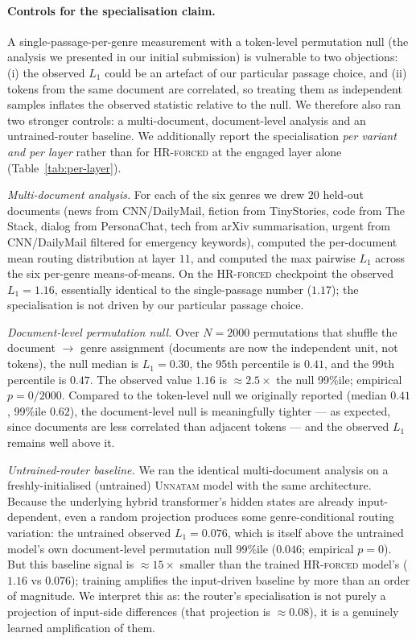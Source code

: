 \paragraph{Controls for the specialisation claim.} A single-passage-per-genre measurement with a token-level permutation null (the analysis we presented in our initial submission) is vulnerable to two objections: (i) the observed $L_1$ could be an artefact of our particular passage choice, and (ii) tokens from the same document are correlated, so treating them as independent samples inflates the observed statistic relative to the null. We therefore also ran two stronger controls: a multi-document, document-level analysis and an untrained-router baseline. We additionally report the specialisation \emph{per variant and per layer} rather than for \textsc{HR-forced} at the engaged layer alone (Table~\ref{tab:per-layer}).

\emph{Multi-document analysis.} For each of the six genres we drew $20$ held-out documents (news from CNN/DailyMail, fiction from TinyStories, code from The Stack, dialog from PersonaChat, tech from arXiv summarisation, urgent from CNN/DailyMail filtered for emergency keywords), computed the per-document mean routing distribution at layer $11$, and computed the max pairwise $L_1$ across the six per-genre means-of-means. On the \textsc{HR-forced} checkpoint the observed $L_1 = 1.16$, essentially identical to the single-passage number ($1.17$); the specialisation is not driven by our particular passage choice.

\emph{Document-level permutation null.} Over $N=2000$ permutations that shuffle the document $\to$ genre assignment (documents are now the independent unit, not tokens), the null median is $L_1 = 0.30$, the 95th percentile is $0.41$, and the 99th percentile is $0.47$. The observed value $1.16$ is $\approx 2.5\times$ the null 99\%ile; empirical $p = 0/2000$. Compared to the token-level null we originally reported (median $0.41$, 99\%ile $0.62$), the document-level null is meaningfully tighter --- as expected, since documents are less correlated than adjacent tokens --- and the observed $L_1$ remains well above it.

\emph{Untrained-router baseline.} We ran the identical multi-document analysis on a freshly-initialised (untrained) \textsc{Unnatam} model with the same architecture. Because the underlying hybrid transformer's hidden states are already input-dependent, even a random projection produces some genre-conditional routing variation: the untrained observed $L_1 = 0.076$, which is itself above the untrained model's own document-level permutation null 99\%ile ($0.046$; empirical $p = 0$). But this baseline signal is $\approx 15\times$ smaller than the trained \textsc{HR-forced} model's ($1.16$ vs $0.076$); training amplifies the input-driven baseline by more than an order of magnitude. We interpret this as: the router's specialisation is not purely a projection of input-side differences (that projection is $\approx 0.08$), it is a genuinely learned amplification of them.

